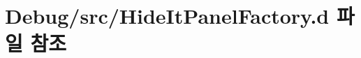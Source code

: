 \hypertarget{_hide_it_panel_factory_8d}{\section{Debug/src/\+Hide\+It\+Panel\+Factory.d 파일 참조}
\label{_hide_it_panel_factory_8d}
}
